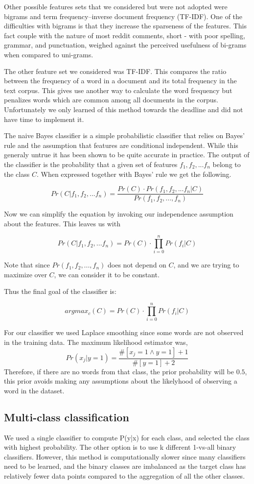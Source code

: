 \documentclass[10pt,twocolumn]{article}
\begin{document}
Other possible features sets that we considered but were not adopted were bigrams and term frequency–inverse document frequency (TF-IDF)\cite{salton1983introduction}. One of the difficulties with bigrams is that they increase the sparseness of the features. This fact couple with the nature of most reddit comments, short - with poor spelling, grammar, and punctuation, weighed against the perceived usefulness of bi-grams when compared to uni-grams.

The other feature set we considered  was TF-IDF. This compares the ratio between the frequency of a word in a document and its total frequency in the text corpus. This gives use another way to calculate the word frequency but penalizes words which are common among all documents in the corpus. Unfortunately we only learned of this method towards the deadline and did not have time to implement it.

The naive Bayes classifier is a simple probabilistic classifier that relies on Bayes' rule and the assumption that features are conditional independent. While this generaly untrue it has been shown to be quite accurate in practice. The output of the classifier is the probability that a given set of features $f_1,f_2,...f_n$ belong to the class $C$. When expressed together with Bayes' rule we get the following.

\[ Pr(C|f_1,f_2,...f_n) = \frac{Pr(C) \cdot Pr(f_1,f_2,...f_n|C)}{Pr(f_1,f_2,...,f_n)} \]

Now we can simplify the equation by invoking our independence assumption about the features. This leaves us with

\[ Pr(C|f_1,f_2,...f_n) =  Pr(C) \cdot \prod_{i=0}^{n} Pr(f_i|C) \]

Note that since $Pr(f_1,f_2,...,f_n)$ does not depend on $C$, and we are trying to maximize over $C$, we can consider it to be constant.

Thus the final goal of the classifier is:

\[ argmax_c (C) = Pr(C) \cdot \prod_{i=0}^{n} Pr(f_i|C) \]

For our classifier we used Laplace smoothing since some words are not observed in the training data. The maximum likelihood estimator was,
\[
Pr(x_j|y=1) = \frac {\#[x_j=1 \land y=1]+1}{\#[y=1]+2}
\]
Therefore, if there are no words from that class, the prior probability will be $0.5$, this prior avoids making any assumptions about the likelyhood of observing a word in the dataset.

\subsection*{Multi-class classification}
We used a single classifier to compute P(y|x) for each class, and selected the class with highest probability.
The other option is to use k different 1-vs-all binary classifiers. However, this method is computationally slower since many classifiers need to be learned, and the binary classes are imbalanced as the target class has relatively fewer data points compared to the aggregation of all the other classes.
\end{document}
